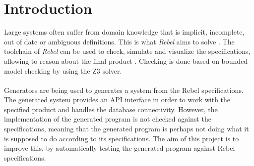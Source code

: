 \chapter{Introduction}
\label{chp:intro}
Large systems often suffer from domain knowledge that is implicit, incomplete, out of date or ambiguous definitions. This is what \textit{Rebel} aims to solve \cite{stoel2016solving}. The toolchain of \textit{Rebel} can be used to check, simulate and visualize the specifications, allowing to reason about the final product \cite{stoelcase}. Checking is done based on bounded model checking by using the Z3 solver.\\
\\
Generators are being used to generates a system from the Rebel specifications. The generated system provides an API interface in order to work with the specified product and handles the database connectivity. However, the implementation of the generated program is not checked against the specifications, meaning that the generated program is perhaps not doing what it is supposed to do according to its specifications. The aim of this project is to improve this, by automatically testing the generated program against Rebel specifications.


